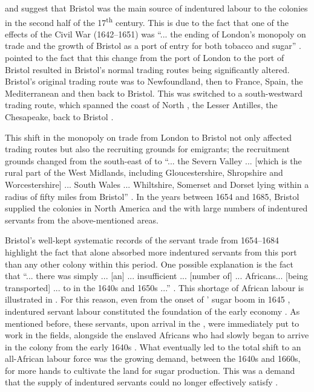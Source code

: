 \label{6.2.1.1.2}
\citet{Beckles89} and \citet{Sacks93} suggest that Bristol was the main source of indentured labour to the  colonies in the second half of the 17\textsuperscript{th} century. This is due to the fact that one of the effects of the  Civil War (1642--1651) was ``... the ending of London's monopoly on trade and the growth of Bristol as a port of entry for both tobacco and sugar'' \citep[137]{Currer82}. \citet{Currer82} pointed to the fact that this change from the port of London to the port of Bristol resulted in Bristol's normal trading routes being significantly altered. Bristol's original trading route was to Newfoundland, then to France, Spain, the Mediterranean and then back to Bristol. This was switched to a south-westward trading route, which spanned the coast of North , the Lesser Antilles, the Chesapeake, back to Bristol \citep{Currer82}.

This shift in the monopoly on trade from London to Bristol not only affected trading routes but also the recruiting grounds for emigrants; the recruitment grounds changed from the south-east of  to ``... the Severn Valley ... [which is the rural part of the West Midlands, including Gloucestershire, Shropshire and Worcestershire] ... South Wales ... Whiltshire, Somerset and Dorset lying within a radius of fifty miles from Bristol'' \citep[138]{Currer82}. In the years between 1654 and 1685, Bristol supplied the  colonies in North America and the  with large numbers of indentured servants from the above-mentioned areas.

Bristol's well-kept systematic records of the servant trade from 1654--1684 \citep{Beckles89} highlight the fact that  alone absorbed more indentured servants from this port than any other  colony \citep{Beckles89} within this period. One possible explanation is the fact that ``... there was simply ... [an] ... insufficient ... [number of] ... Africans... [being transported] ... to  in the 1640s and 1650s ...'' \citep[379]{Morgan11}. This shortage of African labour is illustrated in . For this reason, even from the onset of ' sugar boom in 1645 \citep{Elias10}, indentured servant labour constituted the foundation of the early   economy \citep{Morgan11}. As mentioned before, these servants, upon arrival in the , were immediately put to work in the fields, alongside the enslaved Africans who had slowly began to arrive in the colony from the early 1640s \citep{Brewer96, Galenson02, Amussen09}. What eventually led to the total shift to an all-African labour force was the growing demand, between the 1640s and 1660s, for more hands to cultivate the land for sugar production. This was a demand that the supply of indentured servants could no longer effectively satisfy \citep{Morgan11}.

